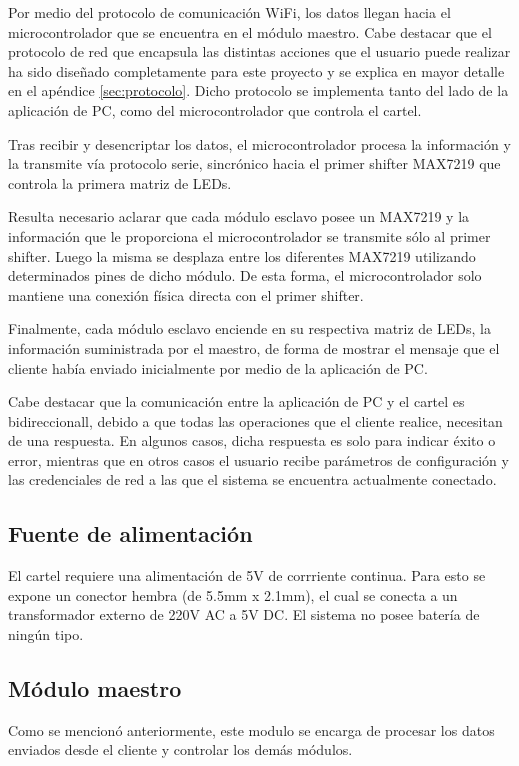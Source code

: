 Por medio del protocolo de comunicación WiFi, los datos llegan hacia el microcontrolador que se encuentra en el módulo maestro. Cabe destacar que el protocolo de red que encapsula las distintas acciones que el usuario puede realizar ha sido diseñado completamente para este proyecto y se explica en mayor detalle en el apéndice \ref{sec:protocolo}.
Dicho protocolo se implementa tanto del lado de la aplicación de PC, como del microcontrolador que controla el cartel.

Tras recibir y desencriptar los datos, el microcontrolador procesa la información y la transmite vía protocolo serie, sincrónico hacia el primer shifter MAX7219 que controla la primera matriz de LEDs.

Resulta necesario aclarar que cada módulo esclavo posee un MAX7219 y la información que le proporciona el microcontrolador se transmite sólo al primer shifter. Luego la misma se desplaza entre los diferentes MAX7219 utilizando determinados pines de dicho módulo.
De esta forma, el microcontrolador solo mantiene una conexión física directa con el primer shifter.

Finalmente, cada módulo esclavo enciende en su respectiva matriz de LEDs, la información suministrada por el maestro, de forma de mostrar el mensaje que el cliente había enviado inicialmente por medio de la aplicación de PC.

Cabe destacar que la comunicación entre la aplicación de PC y el cartel es bidireccionall, debido a que todas las operaciones que el cliente realice, necesitan de una respuesta.
En algunos casos, dicha respuesta es solo para indicar éxito o error, mientras que en otros casos el usuario recibe parámetros de configuración y las credenciales de red a las que el sistema se encuentra actualmente conectado.

\subsection{Fuente de alimentación}
El cartel requiere una alimentación de 5V de corrriente continua. Para esto se expone un conector hembra (de 5.5mm x 2.1mm), el cual se conecta a un transformador externo de 220V AC a 5V DC. El sistema no posee batería de ningún tipo.

\subsection{Módulo maestro}
Como se mencionó anteriormente, este modulo se encarga de procesar los datos enviados desde el cliente y controlar los demás módulos.

